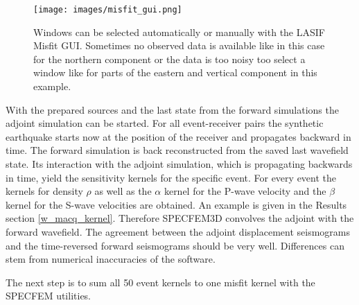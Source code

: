 \begin{figure}[h]
\begin{center}
\texttt{[image: images/misfit\_gui.png]}
\caption{Windows can be selected automatically or manually with the LASIF Misfit GUI.
Sometimes no observed data is available like in this case for the northern component
or the data is too noisy too select a window like for parts of the eastern and vertical component in this example.}
\label{misfit_gui}
\end{center}
\end{figure}

With the prepared sources and the last state from the forward simulations the adjoint simulation can be started.
For all event-receiver pairs the synthetic earthquake starts now at the position of the receiver and propagates
backward in time.  
The forward simulation is back reconstructed from the saved last wavefield state. 
Its interaction with the adjoint simulation, which is propagating backwards in time,
yield the sensitivity kernels for the specific event. 
For every event the kernels for density $\rho$ as well as the $\alpha$ kernel for the P-wave velocity and the
$\beta$ kernel for the S-wave velocities are obtained. 
An example is given in the Results section \autoref{w_macq_kernel}.
Therefore SPECFEM3D convolves the adjoint with the forward wavefield.
The agreement between the adjoint displacement seismograms and the time-reversed forward seismograms should be very well. %
Differences can stem from numerical inaccuracies of the software. %

The next step is to sum all 50 event kernels to one misfit kernel with the SPECFEM utilities.






